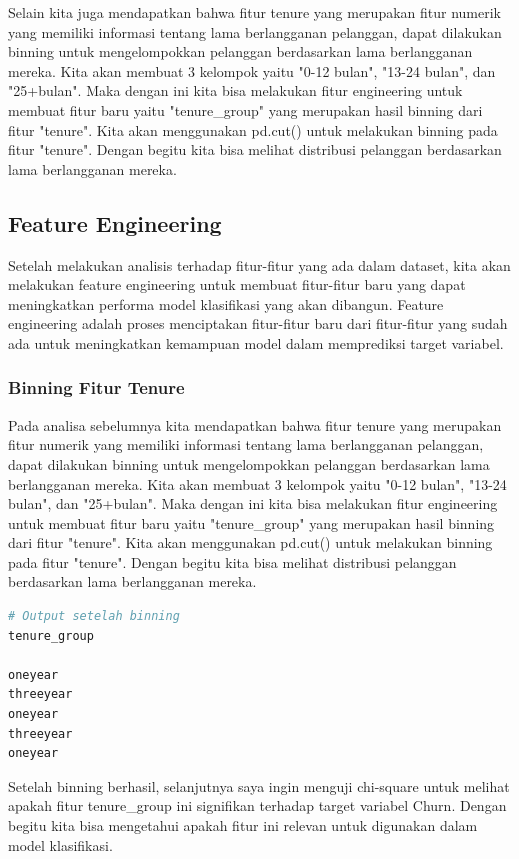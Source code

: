 Selain kita juga mendapatkan bahwa fitur tenure yang merupakan fitur numerik yang memiliki informasi tentang lama berlangganan pelanggan, dapat dilakukan binning untuk mengelompokkan pelanggan berdasarkan lama berlangganan mereka. Kita akan membuat 3 kelompok yaitu "0-12 bulan", "13-24 bulan", dan "25+bulan". Maka dengan ini kita bisa melakukan fitur engineering untuk membuat fitur baru yaitu "tenure\_group" yang merupakan hasil binning dari fitur "tenure". Kita akan menggunakan pd.cut() untuk melakukan binning pada fitur "tenure". Dengan begitu kita bisa melihat distribusi pelanggan berdasarkan lama berlangganan mereka.

\subsection{Feature Engineering}
Setelah melakukan analisis terhadap fitur-fitur yang ada dalam dataset, kita akan melakukan feature engineering untuk membuat fitur-fitur baru yang dapat meningkatkan performa model klasifikasi yang akan dibangun. Feature engineering adalah proses menciptakan fitur-fitur baru dari fitur-fitur yang sudah ada untuk meningkatkan kemampuan model dalam memprediksi target variabel.

\subsubsection{Binning Fitur Tenure}
Pada analisa sebelumnya kita mendapatkan bahwa fitur tenure yang merupakan fitur numerik yang memiliki informasi tentang lama berlangganan pelanggan, dapat dilakukan binning untuk mengelompokkan pelanggan berdasarkan lama berlangganan mereka. Kita akan membuat 3 kelompok yaitu "0-12 bulan", "13-24 bulan", dan "25+bulan". Maka dengan ini kita bisa melakukan fitur engineering untuk membuat fitur baru yaitu "tenure\_group" yang merupakan hasil binning dari fitur "tenure". Kita akan menggunakan pd.cut() untuk melakukan binning pada fitur "tenure". Dengan begitu kita bisa melihat distribusi pelanggan berdasarkan lama berlangganan mereka.

\begin{lstlisting}[language=Python, caption=Feature Engineering Binning Fitur Tenure]
# Output setelah binning
tenure_group

oneyear    
threeyear
oneyear  
threeyear
oneyear
\end{lstlisting}

Setelah binning berhasil, selanjutnya saya ingin menguji chi-square untuk melihat apakah fitur tenure\_group ini signifikan terhadap target variabel Churn. Dengan begitu kita bisa mengetahui apakah fitur ini relevan untuk digunakan dalam model klasifikasi.

